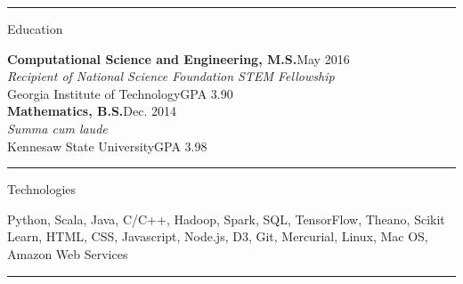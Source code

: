 \documentclass[]{article}
\def \mysection[#1]{
\vspace{.3cm}
\hrule
\vspace{.3cm}
{\large #1 \par}
\vspace{.2cm}
}
\begin{document}
\mysection[Education]
\textbf{Computational Science and Engineering, M.S.}\hfill May 2016\\\textit{Recipient of National Science Foundation STEM Fellowship}\\Georgia Institute of Technology\hspace{10pt}GPA 3.90\\

\textbf{Mathematics, B.S.}\hfill Dec. 2014\\\textit{Summa cum laude}\\ Kennesaw State University\hspace{10pt}GPA 3.98

\mysection[Technologies]
Python, Scala, Java, C/C++, Hadoop, Spark, SQL, TensorFlow, Theano, Scikit Learn, HTML, CSS, Javascript, Node.js, D3, Git, Mercurial, Linux, Mac OS, Amazon Web Services \\
\hrule
\end{document}
